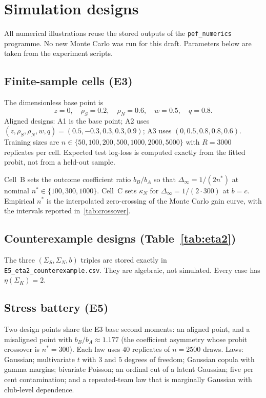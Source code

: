 \section{Simulation designs}
\label{app:designs}

All numerical illustrations reuse the stored outputs of the \texttt{pef\_numerics} programme.
No new Monte Carlo was run for this draft.
Parameters below are taken from the experiment scripts.

\subsection*{Finite-sample cells (E3)}

The dimensionless base point is
\[
  z=0,\quad \rho_S=0.2,\quad \rho_N=0.6,\quad w=0.5,\quad q=0.8.
\]
Aligned designs: A1 is the base point; A2 uses $(z,\rho_S,\rho_N,w,q)=(0.5,-0.3,0.3,0.3,0.9)$; A3 uses $(0,0.5,0.8,0.8,0.6)$.
Training sizes are $n\in\{50,100,200,500,1000,2000,5000\}$ with $R=3000$ replicates per cell.
Expected test log-loss is computed exactly from the fitted probit, not from a held-out sample.

Cell~B sets the outcome coefficient ratio $b_B/b_A$ so that $\Delta_\infty=1/(2n^*)$ at nominal $n^*\in\{100,300,1000\}$.
Cell~C sets $\kappa_N$ for $\Delta_\infty=1/(2\cdot 300)$ at $b=c$.
Empirical $n^*$ is the interpolated zero-crossing of the Monte Carlo gain curve, with the intervals reported in~\cref{tab:crossover}.

\subsection*{Counterexample designs (Table~\ref{tab:eta2})}

The three $(\Sigma_S,\Sigma_N,b)$ triples are stored exactly in \texttt{E5\_eta2\_counterexample.csv}.
They are algebraic, not simulated.
Every case has $\eta(\Sigma_K)=2$.

\subsection*{Stress battery (E5)}

Two design points share the E3 base second moments: an aligned point, and a misaligned point with $b_B/b_A\approx 1.177$ (the coefficient asymmetry whose probit crossover is $n^*=300$).
Each law uses $40$ replicates of $n=2500$ draws.
Laws: Gaussian; multivariate $t$ with $3$ and $5$ degrees of freedom; Gaussian copula with gamma margins; bivariate Poisson; an ordinal cut of a latent Gaussian; five per cent contamination; and a repeated-team law that is marginally Gaussian with club-level dependence.

